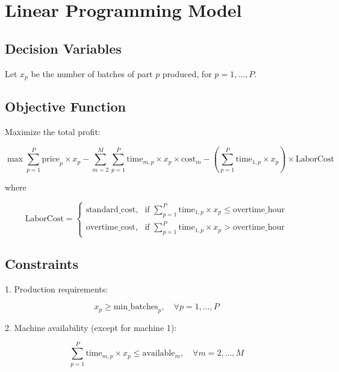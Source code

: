 \documentclass{article}
\begin{document}
\section*{Linear Programming Model}

\subsection*{Decision Variables}
Let \( x_p \) be the number of batches of part \( p \) produced, for \( p = 1, \ldots, P \).

\subsection*{Objective Function}
Maximize the total profit:

\[
\max \sum_{p=1}^{P} \text{price}_p \times x_p 
- \sum_{m=2}^{M} \sum_{p=1}^{P} \text{time}_{m,p} \times x_p \times \text{cost}_m 
- \left( \sum_{p=1}^{P} \text{time}_{1,p} \times x_p \right) \times \text{LaborCost}
\]

where

\[
\text{LaborCost} = 
\begin{cases} 
\text{standard\_cost}, & \text{if } \sum_{p=1}^{P} \text{time}_{1,p} \times x_p \leq \text{overtime\_hour} \\
\text{overtime\_cost}, & \text{if } \sum_{p=1}^{P} \text{time}_{1,p} \times x_p > \text{overtime\_hour} 
\end{cases}
\]

\subsection*{Constraints}

1. Production requirements:

\[
x_p \geq \text{min\_batches}_p, \quad \forall p = 1, \ldots, P
\]

2. Machine availability (except for machine 1):

\[
\sum_{p=1}^{P} \text{time}_{m,p} \times x_p \leq \text{available}_m, \quad \forall m = 2, \ldots, M
\]
\end{document}

